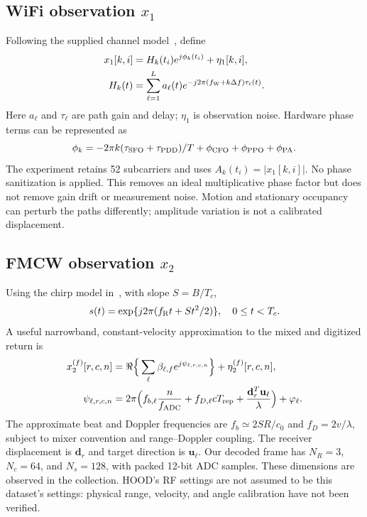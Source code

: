 \documentclass[conference,10pt,letterpaper]{IEEEtran}
\begin{document}
\subsection{WiFi observation $x_1$}
Following the supplied channel model~\cite{wifi}, define
\begin{align}
x_1[k,i]&=H_k(t_i)e^{j\phi_k(t_i)}+\eta_1[k,i],\label{eq:wifi}\\
H_k(t)&=\sum_{\ell=1}^{L}a_\ell(t)e^{-j2\pi(f_{\rm W}+k\Delta f)\tau_\ell(t)}.\label{eq:paths}
\end{align}
Here $a_\ell$ and $\tau_\ell$ are path gain and delay; $\eta_1$ is observation noise. Hardware phase terms can be represented as
\begin{equation}
\phi_k=-2\pi k(\tau_{\rm SFO}+\tau_{\rm PDD})/T
+\phi_{\rm CFO}+\phi_{\rm PPO}+\phi_{\rm PA}.
\end{equation}
The experiment retains 52 subcarriers and uses $A_k(t_i)=|x_1[k,i]|$. No phase sanitization is applied. This removes an ideal multiplicative phase factor but does not remove gain drift or measurement noise. Motion and stationary occupancy can perturb the paths differently; amplitude variation is not a calibrated displacement.

\subsection{FMCW observation $x_2$}
Using the chirp model in~\cite{hood}, with slope $S=B/T_c$,
\begin{equation}
s(t)=\exp\{j2\pi(f_{\rm R}t+St^2/2)\},\quad 0\leq t<T_c.
\end{equation}
A useful narrowband, constant-velocity approximation to the mixed and digitized return is
\begin{align}
x_2^{(f)}[r,c,n]&=\Re\Big\{\sum_{\ell}\beta_{\ell,f}
 e^{j\psi_{\ell,r,c,n}}\Big\}+\eta_2^{(f)}[r,c,n],\\
\psi_{\ell,r,c,n}&=2\pi\Big(f_{b,\ell}\frac{n}{f_{\rm ADC}}
+f_{D,\ell}cT_{\rm rep}+\frac{\mathbf d_r^T\mathbf u_\ell}{\lambda}\Big)
+\varphi_\ell.\label{eq:radar}
\end{align}
The approximate beat and Doppler frequencies are $f_b\simeq2SR/c_0$ and $f_D=2v/\lambda$, subject to mixer convention and range--Doppler coupling. The receiver displacement is $\mathbf d_r$ and target direction is $\mathbf u_\ell$. Our decoded frame has $N_R=3$, $N_c=64$, and $N_s=128$, with packed 12-bit ADC samples. These dimensions are observed in the collection. HOOD's RF settings are not assumed to be this dataset's settings: physical range, velocity, and angle calibration have not been verified.
\end{document}
